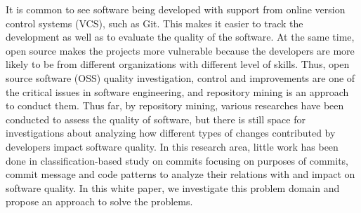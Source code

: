 It is common to see software being developed with support from online version control systems (VCS), such as Git. This makes it easier to track the development as well as to evaluate the quality of the software.
At the same time, open source makes the projects more vulnerable because the developers are more likely to be from different organizations with different level of skills.
Thus, open source software (OSS) quality investigation, control and improvements are one of the critical issues in software engineering, and repository mining is an approach to conduct them.
Thus far, by repository mining, various researches have been conducted to assess the quality of software, but there is still space for investigations about analyzing how different types of changes contributed by developers impact software quality.
In this research area, little work has been done in classification-based study on commits focusing on purposes of commits, commit message and code patterns to analyze their relations with and impact on software quality.
In this white paper, we investigate this problem domain and propose an approach to solve the problems.